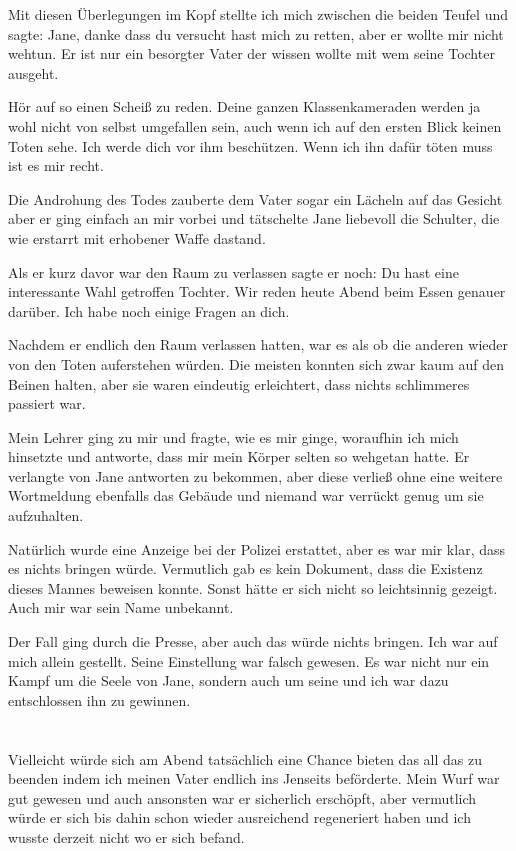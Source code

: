 \documentclass[11pt, a5paper]{article}
\newcommand{\te}{Jane } %
\newcommand{\Te}{Jane} %
\begin{document}
\begin{spacing}{1.2}
		 Mit diesen Überlegungen im Kopf stellte ich mich zwischen die beiden Teufel und sagte: \frqq \Te , danke dass du versucht hast mich zu retten, aber er wollte mir nicht wehtun. Er ist nur ein besorgter Vater der wissen wollte mit wem seine Tochter ausgeht.\flqq
		 
		 \frqq Hör auf so einen Scheiß zu reden. Deine ganzen Klassenkameraden werden ja wohl nicht von selbst umgefallen sein, auch wenn ich auf den ersten Blick keinen Toten sehe. Ich werde dich vor ihm beschützen. Wenn ich ihn dafür töten muss ist es mir recht.\flqq
		
	    Die Androhung des Todes zauberte dem Vater sogar ein Lächeln auf das Gesicht aber er ging einfach an mir vorbei und tätschelte \te liebevoll die Schulter, die wie erstarrt mit erhobener Waffe dastand.
		
		Als er kurz davor war den Raum zu verlassen sagte er noch: \frqq Du hast eine interessante Wahl getroffen Tochter. Wir reden heute Abend beim Essen genauer darüber. Ich habe noch einige Fragen an dich.\flqq
		
		Nachdem er endlich den Raum verlassen hatten, war es als ob die anderen wieder von den Toten auferstehen würden. Die meisten konnten sich zwar kaum auf den Beinen halten, aber sie waren eindeutig erleichtert, dass nichts schlimmeres passiert war.
		
		Mein Lehrer ging zu mir und fragte, wie es mir ginge, woraufhin ich mich hinsetzte und antworte, dass mir mein Körper selten so wehgetan hatte. Er verlangte von \te antworten zu bekommen, aber diese verließ ohne eine weitere Wortmeldung ebenfalls das Gebäude und niemand war verrückt genug um sie aufzuhalten.
		
		Natürlich wurde eine Anzeige bei der Polizei erstattet, aber es war mir klar, dass es nichts bringen würde. Vermutlich gab es kein Dokument, dass die Existenz dieses Mannes beweisen konnte. Sonst hätte er sich nicht so leichtsinnig gezeigt. Auch mir war sein Name unbekannt.
		
		Der Fall ging durch die Presse, aber auch das würde nichts bringen. Ich war auf mich allein gestellt. Seine Einstellung war falsch gewesen. Es war nicht nur ein Kampf um die Seele von \Te , sondern auch um seine und ich war dazu entschlossen ihn zu gewinnen.\newpage
		
		\section{}
		Vielleicht würde sich am Abend tatsächlich eine Chance bieten das all das zu beenden indem ich meinen Vater endlich ins Jenseits beförderte. Mein Wurf war gut gewesen und auch ansonsten war er sicherlich erschöpft, aber vermutlich würde er sich bis dahin schon wieder ausreichend regeneriert haben und ich wusste derzeit nicht wo er sich befand.
		

\end{spacing}
\end{document}
